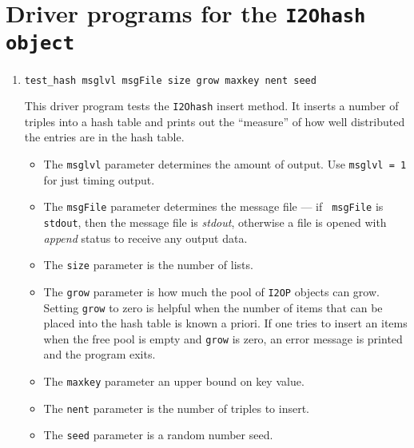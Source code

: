 \par
\section{Driver programs for the {\tt I2Ohash object}}
\label{section:I2Ohash:drivers}
\par
\begin{enumerate}
\item
\begin{verbatim}
test_hash msglvl msgFile size grow maxkey nent seed
\end{verbatim}
This driver program tests the {\tt I2Ohash} insert method.
It inserts a number of triples into a hash table and prints
out the ``measure'' of how well distributed the entries are in the
hash table.
\par
\begin{itemize}
\item
The {\tt msglvl} parameter determines the amount of output.
Use {\tt msglvl = 1} for just timing output.
\item
The {\tt msgFile} parameter determines the message file --- if {\tt
msgFile} is {\tt stdout}, then the message file is {\it stdout},
otherwise a file is opened with {\it append} status to receive any
output data.
\item
The {\tt size} parameter is the number of lists.
\item
The {\tt grow} parameter is how much the pool of {\tt I2OP} objects
can grow.
Setting {\tt grow} to zero is helpful when the number of items 
that can be placed into the hash table is known a priori.
If one tries to insert an items when the free pool is empty and
{\tt grow} is zero, an error message is printed and the program
exits.
\item
The {\tt maxkey} parameter an upper bound on key value.
\item
The {\tt nent} parameter is the number of {\tt <key1, key2, pointer>}
triples to insert.
\item
The {\tt seed} parameter is a random number seed.
\end{itemize}
\end{enumerate}
